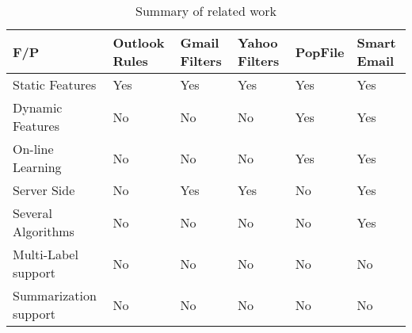 \begin{center}
    \begin{table}[H]
      \begin{tabular}{ | p{3cm} | p{2cm} | p{2cm} | p{2cm} | p{2cm} | p{2cm} |}
        \hline
        F/P              & Outlook Rules & Gmail Filters & Yahoo Filters & PopFile \cite{POPFILE} & Smart Email\\ \hline
        Static Features  &    Yes        &    Yes        &    Yes      &    Yes  & \cellcolor[gray]{0.9}Yes \\ \hline     
        Dynamic Features &    No        &    No         &    No        &    Yes  & \cellcolor[gray]{0.9}Yes  \\ \hline
        On-line Learning &    No        &    No         &    No        &    Yes  & \cellcolor[gray]{0.9}Yes \\ \hline
        Server Side      &    No        &    Yes        &    Yes       &    No   & \cellcolor[gray]{0.9}Yes\\ \hline
        Several Algorithms &    No        &    No &    No       &    No   & \cellcolor[gray]{0.9}Yes\\ \hline
        Multi-Label support &    No        &    No &    No       &    No  & \cellcolor[gray]{0.9}No \\ \hline
        Summarization support&    No        &    No &    No       &    No & \cellcolor[gray]{0.9}No  \\ \hline
      \end{tabular}
      \caption[Summary of related work]{Summary of related work}
    \end{table}
\end{center}  
